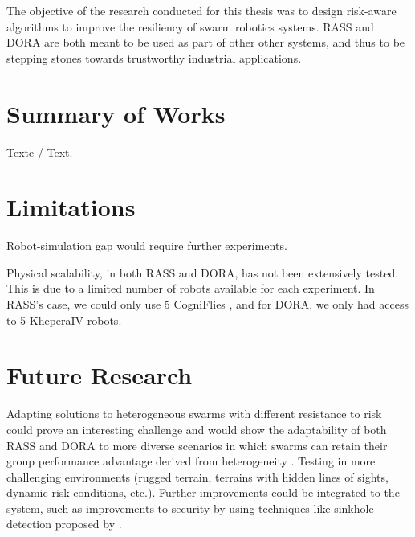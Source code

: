 \label{sec:Conclusion}
The objective of the research conducted for this thesis was to design risk-aware algorithms to improve the resiliency of swarm robotics systems. RASS and DORA are both meant to be used as part of other other systems, and thus to be stepping stones towards trustworthy industrial applications.

\section{Summary of Works}
Texte / Text.

\section{Limitations}\label{sec:Limitations}
Robot-simulation gap would require further experiments.

Physical scalability, in both RASS and DORA, has not been extensively tested. This is due to a limited number of robots available for each experiment. In RASS's case, we could only use 5 CogniFlies \cite{de2021flexible}, and for DORA, we only had access to 5 KheperaIV robots.

\section{Future Research}
Adapting solutions to heterogeneous swarms with different resistance to risk could prove an interesting challenge and would show the adaptability of both RASS and DORA to more diverse scenarios in which swarms can retain their group performance advantage derived from heterogeneity \cite{ferrante2015evolution}. Testing in more challenging environments (rugged terrain, terrains with hidden lines of sights, dynamic risk conditions, etc.). Further improvements could be integrated to the system, such as improvements to security by using techniques like sinkhole detection proposed by \cite{abdullah2015detecting}.
